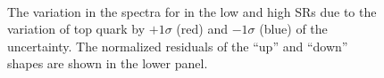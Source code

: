 \begin{figure}[h]
  \centering
   \\
  \caption{The variation in the \ptmiss spectra for \ttll in the low and high \mttll SRs due to the variation of top quark \pt by $+1\sigma$ (red) and $-1\sigma$ (blue) of the uncertainty. The normalized residuals of the ``up'' and ``down'' shapes are shown in the lower panel.}
  \label{fig:topPtshape}
\end{figure}

